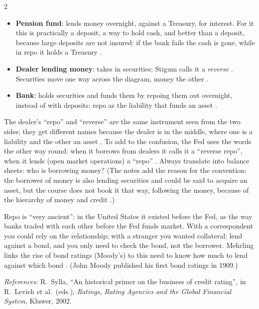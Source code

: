 \begin{paracol}{2}
\begin{taccts}
\quad
{}\quad
{}
\end{taccts}

\begin{itemize}
  \item \textbf{Pension fund}: lends money overnight, against a Treasury, for interest. For it this is practically a deposit, a way to hold cash, and
        better than a deposit, because large deposits are not insured: if the bank fails the cash is gone, while in repo it holds a Treasury
        .
  \item \textbf{Dealer lending money}: takes in securities; Stigum calls it a \emph{reverse} . Securities move one way across the
        diagram, money the other .
  \item \textbf{Bank}: holds securities and funds them by repoing them out overnight, instead of with deposits: repo as the liability that funds an asset
        .
\end{itemize}
The dealer's ``repo'' and ``reverse'' are the same instrument seen from the two sides; they get different names because the dealer is in the middle,
where one is a liability and the other an asset . To add to the confusion, the Fed uses the words the other way round: when it
borrows from dealers it calls it a ``reverse repo'', when it lends (open market operations) a ``repo'' . Always translate
into balance sheets: who is borrowing money?  (The notes add the reason for the convention: the borrower of money is also lending securities and
could be said to acquire an asset, but the course does not book it that way, following the money, because of the hierarchy of money and credit .)

\begin{history}
Repo is ``very ancient'': in the United States it existed before the Fed, as the way banks traded with each other before the Fed funds market. With a
correspondent you could rely on the relationship; with a stranger you wanted collateral: lend against a bond, and you only need to check the bond, not the
borrower. Mehrling links the rise of bond ratings (Moody's) to this need to know how much to lend against which bond .
(John Moody published his first bond ratings in 1909.)\par
\emph{References:} R.~Sylla, ``An historical primer on the business of credit rating'', in R.~Levich et al.\ (eds.), \emph{Ratings, Rating Agencies and the
Global Financial System}, Kluwer, 2002.
\end{history}


\end{paracol}
